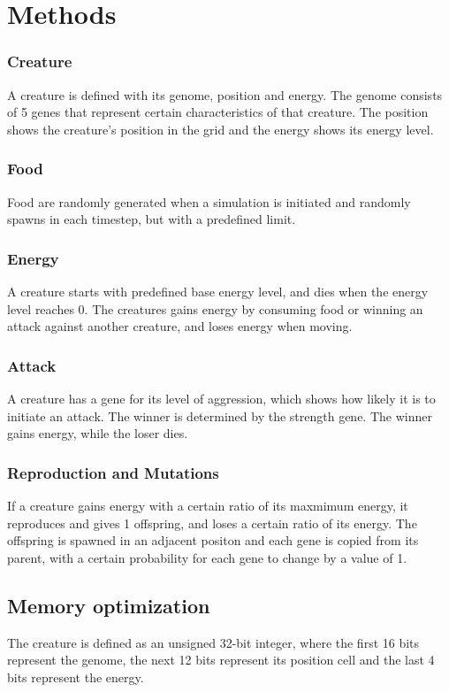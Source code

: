 \documentclass{article}
\begin{document}
\section{Methods}
\subsubsection{Creature}
A creature is defined with its genome, position and energy.
The genome consists of 5 genes that represent certain characteristics of that creature.
The position shows the creature's position in the grid and the energy shows its energy level.
\subsubsection{Food}
Food are randomly generated when a simulation is initiated and randomly spawns in each timestep, but with a predefined limit.
\subsubsection{Energy}
A creature starts with predefined base energy level, and dies when the energy level reaches 0.
The creatures gains energy by consuming food or winning an attack against another creature, and loses energy when moving.
\subsubsection{Attack}
A creature has a gene for its level of aggression, which shows how likely it is to initiate an attack.
The winner is determined by the strength gene. The winner gains energy, while the loser dies.
\subsubsection{Reproduction and Mutations}
If a creature gains energy with a certain ratio of its maxmimum energy, it reproduces and gives 1 offspring, and loses a certain ratio of its energy.
The offspring is spawned in an adjacent positon and each gene is copied from its parent, with a certain probability for each gene to change by a value of 1.
\subsection{Memory optimization}
The creature is defined as an unsigned 32-bit integer, where the first 16 bits represent the genome, the next 12 bits represent its position cell and the last 4 bits represent the energy.
\end{document}
